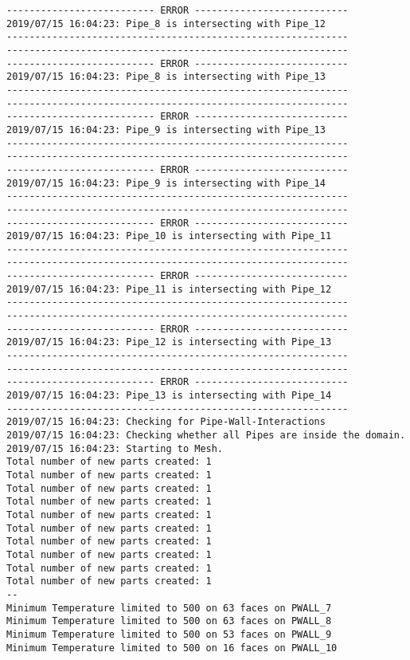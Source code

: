 \documentclass{article}
\begin{document}
{\begin{verbatim}
-------------------------- ERROR ---------------------------
2019/07/15 16:04:23: Pipe_8 is intersecting with Pipe_12
------------------------------------------------------------
------------------------------------------------------------
-------------------------- ERROR ---------------------------
2019/07/15 16:04:23: Pipe_8 is intersecting with Pipe_13
------------------------------------------------------------
------------------------------------------------------------
-------------------------- ERROR ---------------------------
2019/07/15 16:04:23: Pipe_9 is intersecting with Pipe_13
------------------------------------------------------------
------------------------------------------------------------
-------------------------- ERROR ---------------------------
2019/07/15 16:04:23: Pipe_9 is intersecting with Pipe_14
------------------------------------------------------------
------------------------------------------------------------
-------------------------- ERROR ---------------------------
2019/07/15 16:04:23: Pipe_10 is intersecting with Pipe_11
------------------------------------------------------------
------------------------------------------------------------
-------------------------- ERROR ---------------------------
2019/07/15 16:04:23: Pipe_11 is intersecting with Pipe_12
------------------------------------------------------------
------------------------------------------------------------
-------------------------- ERROR ---------------------------
2019/07/15 16:04:23: Pipe_12 is intersecting with Pipe_13
------------------------------------------------------------
------------------------------------------------------------
-------------------------- ERROR ---------------------------
2019/07/15 16:04:23: Pipe_13 is intersecting with Pipe_14
------------------------------------------------------------
2019/07/15 16:04:23: Checking for Pipe-Wall-Interactions
2019/07/15 16:04:23: Checking whether all Pipes are inside the domain.
2019/07/15 16:04:23: Starting to Mesh.
Total number of new parts created: 1
Total number of new parts created: 1
Total number of new parts created: 1
Total number of new parts created: 1
Total number of new parts created: 1
Total number of new parts created: 1
Total number of new parts created: 1
Total number of new parts created: 1
Total number of new parts created: 1
Total number of new parts created: 1
--
Minimum Temperature limited to 500 on 63 faces on PWALL_7
Minimum Temperature limited to 500 on 63 faces on PWALL_8
Minimum Temperature limited to 500 on 53 faces on PWALL_9
Minimum Temperature limited to 500 on 16 faces on PWALL_10

\end{verbatim}}
\end{document}
